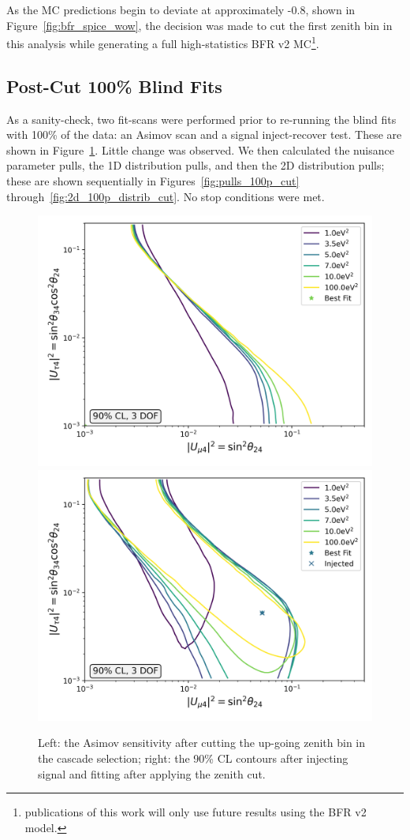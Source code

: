 \documentclass[main.tex]{subfiles}
\begin{document}
As the MC predictions begin to deviate at approximately -0.8, shown in Figure~\ref{fig:bfr_spice_wow}, the decision was made to cut the first zenith bin in this analysis while generating a full high-statistics BFR v2 MC\footnote{publications of this work will only use future results using the BFR v2 model.}. 


\subsection{Post-Cut 100\% Blind Fits}

As a sanity-check, two fit-scans were performed prior to re-running the blind fits with 100\% of the data: an Asimov scan and a signal inject-recover test. 
These are shown in Figure~\ref{fig:new_sense_again_cut}. 
Little change was observed. 
We then calculated the nuisance parameter pulls, the 1D distribution pulls, and then the 2D distribution pulls; these are shown sequentially in Figures~\ref{fig:pulls_100p_cut} through~\ref{fig:2d_100p_distrib_cut}.
No stop conditions were met. 

\begin{figure}
    \centering
    \includegraphics[width=0.45\linewidth]{figures/blindfit/joint_asimov_cut_Realization_daemoncut_Asimov_sterile_0_cl0.9_dof3.png}%
    \includegraphics[width=0.45\linewidth]{figures/blindfit/joint_asimov_cut_signal_Realization_daemoncut_Asimov_sterile_4_cl0.9_dof3.png}
    \caption{Left: the Asimov sensitivity after cutting the up-going zenith bin in the cascade selection; right: the 90\% CL contours after injecting signal and fitting after applying the zenith cut.}\label{fig:new_sense_again_cut}
\end{figure}
\end{document}
